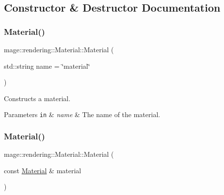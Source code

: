 \subsection{Constructor \& Destructor Documentation}
\mbox{\label{classmage_1_1rendering_1_1_material_a9cc8786b2f56dc53b6e0e0b80e5439e3}} 
\subsubsection{\texorpdfstring{Material()}{Material()}\hspace{0.1cm}{\footnotesize\ttfamily [1/3]}}
{\footnotesize\ttfamily mage\+::rendering\+::\+Material\+::\+Material (\begin{DoxyParamCaption}\item[{std\+::string}]{name = {\ttfamily \char`\"{}material\char`\"{}} }\end{DoxyParamCaption})\hspace{0.3cm}{\ttfamily [explicit]}}

Constructs a material.


\begin{DoxyParams}[1]{Parameters}
\mbox{\tt in}  & {\em name} & The name of the material. \\
\hline
\end{DoxyParams}
\mbox{\label{classmage_1_1rendering_1_1_material_ac7cffca59fe250f10c2e68a875a03e91}} 
\subsubsection{\texorpdfstring{Material()}{Material()}\hspace{0.1cm}{\footnotesize\ttfamily [2/3]}}
{\footnotesize\ttfamily mage\+::rendering\+::\+Material\+::\+Material (\begin{DoxyParamCaption}\item[{const \mbox{\hyperlink{classmage_1_1rendering_1_1_material}{Material}} \&}]{material }\end{DoxyParamCaption})\hspace{0.3cm}{\ttfamily [default]}}

